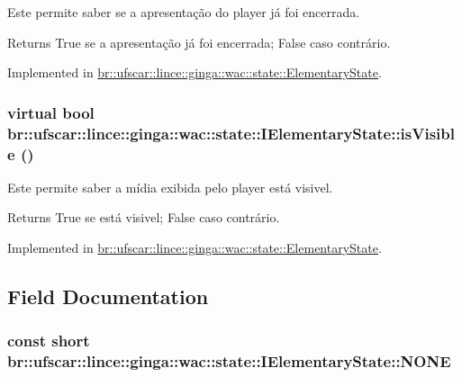 Este permite saber se a apresentação do player já foi encerrada. 

\begin{DoxyReturn}{Returns}
True se a apresentação já foi encerrada; False caso contrário. 
\end{DoxyReturn}


Implemented in \hyperlink{classbr_1_1ufscar_1_1lince_1_1ginga_1_1wac_1_1state_1_1ElementaryState_ab247813eed9444dfb53c59235b1f91a9}{br::ufscar::lince::ginga::wac::state::ElementaryState}.

\hypertarget{classbr_1_1ufscar_1_1lince_1_1ginga_1_1wac_1_1state_1_1IElementaryState_a64cd15f7d8434054345243d877ede453}{
\subsubsection[{isVisible}]{\setlength{\rightskip}{0pt plus 5cm}virtual bool br::ufscar::lince::ginga::wac::state::IElementaryState::isVisible ()}}
\label{classbr_1_1ufscar_1_1lince_1_1ginga_1_1wac_1_1state_1_1IElementaryState_a64cd15f7d8434054345243d877ede453}


Este permite saber a mídia exibida pelo player está visivel. 

\begin{DoxyReturn}{Returns}
True se está visivel; False caso contrário. 
\end{DoxyReturn}


Implemented in \hyperlink{classbr_1_1ufscar_1_1lince_1_1ginga_1_1wac_1_1state_1_1ElementaryState_a2e7a6f98a2b3a239f9b14f22025fc379}{br::ufscar::lince::ginga::wac::state::ElementaryState}.



\subsection{Field Documentation}
\hypertarget{classbr_1_1ufscar_1_1lince_1_1ginga_1_1wac_1_1state_1_1IElementaryState_a6b21cf3f8015ef6cbb839a2fc37e5a85}{
\subsubsection[{NONE}]{\setlength{\rightskip}{0pt plus 5cm}const short {\bf br::ufscar::lince::ginga::wac::state::IElementaryState::NONE}}}
\label{classbr_1_1ufscar_1_1lince_1_1ginga_1_1wac_1_1state_1_1IElementaryState_a6b21cf3f8015ef6cbb839a2fc37e5a85}



